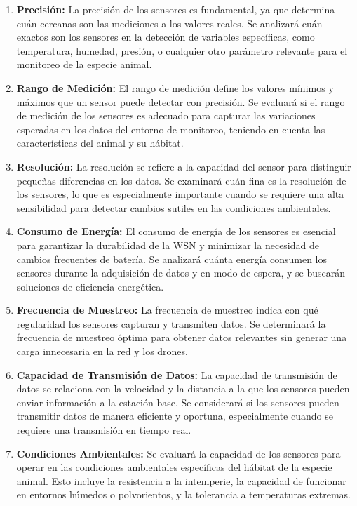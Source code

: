 \begin{enumerate}
\item \textbf{Precisión:} La precisión de los sensores es fundamental, ya que determina cuán cercanas son las mediciones a los valores reales. Se analizará cuán exactos son los sensores en la detección de variables específicas, como temperatura, humedad, presión, o cualquier otro parámetro relevante para el monitoreo de la especie animal.
\item \textbf{Rango de Medición:} El rango de medición define los valores mínimos y máximos que un sensor puede detectar con precisión. Se evaluará si el rango de medición de los sensores es adecuado para capturar las variaciones esperadas en los datos del entorno de monitoreo, teniendo en cuenta las características del animal y su hábitat.
\item \textbf{Resolución:} La resolución se refiere a la capacidad del sensor para distinguir pequeñas diferencias en los datos. Se examinará cuán fina es la resolución de los sensores, lo que es especialmente importante cuando se requiere una alta sensibilidad para detectar cambios sutiles en las condiciones ambientales.
\item\textbf{Consumo de Energía:} El consumo de energía de los sensores es esencial para garantizar la durabilidad de la WSN y minimizar la necesidad de cambios frecuentes de batería. Se analizará cuánta energía consumen los sensores durante la adquisición de datos y en modo de espera, y se buscarán soluciones de eficiencia energética.
\item\textbf{Frecuencia de Muestreo: }La frecuencia de muestreo indica con qué regularidad los sensores capturan y transmiten datos. Se determinará la frecuencia de muestreo óptima para obtener datos relevantes sin generar una carga innecesaria en la red y los drones.
\item \textbf{Capacidad de Transmisión de Datos:} La capacidad de transmisión de datos se relaciona con la velocidad y la distancia a la que los sensores pueden enviar información a la estación base. Se considerará si los sensores pueden transmitir datos de manera eficiente y oportuna, especialmente cuando se requiere una transmisión en tiempo real.
\item \textbf{Condiciones Ambientales:} Se evaluará la capacidad de los sensores para operar en las condiciones ambientales específicas del hábitat de la especie animal. Esto incluye la resistencia a la intemperie, la capacidad de funcionar en entornos húmedos o polvorientos, y la tolerancia a temperaturas extremas.
\end{enumerate}

